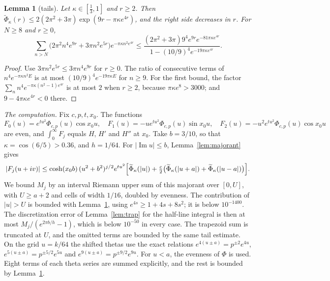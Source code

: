 \documentclass[11pt]{article}
\numberwithin{equation}{section}
\newtheorem{lemma}[theorem]{Lemma}
\theoremstyle{definition}
\theoremstyle{remark}
\DeclareMathOperator{\Ima}{Im}
\begin{document}
\begin{lemma}[tails]\label{lem:tails}
Let $\kappa\in[\tfrac13,1]$ and $r\ge2$. Then
$\widetilde\Phi_\kappa(r)\le2(2\pi^2+3\pi)\exp(9r-\pi\kappa e^{4r})$, and
the right side decreases in $r$. For $N\ge8$ and
$r\ge0$,
\[
\sum_{n>N}\bigl(2\pi^2n^4e^{9r}+3\pi n^2e^{5r}\bigr)e^{-\pi\kappa n^2e^{4r}}
\le\frac{(2\pi^2+3\pi)9^4e^{9r}e^{-81\pi\kappa e^{4r}}}
{1-(10/9)^4e^{-19\pi\kappa e^{4r}}} .
\]
\end{lemma}

\begin{proof}
Use $3\pi n^2e^{5r}\le3\pi n^4e^{9r}$ for $r\ge0$. The ratio of consecutive
terms of $n^4e^{-\pi\kappa n^2E}$ is at most $(10/9)^4e^{-19\pi\kappa E}$ for
$n\ge9$. For the first bound, the factor
$\sum_n n^4e^{-\pi\kappa(n^2-1)e^{4r}}$ is at most $2$ when $r\ge2$, because
$\pi\kappa e^{8}>3000$; and $9-4\pi\kappa e^{4r}<0$ there.
\end{proof}

\medskip\noindent\emph{The computation.} Fix $c,p,t,x_0$. The functions
\[
F_0(u)=e^{tu^2}\Phi_{c,p}(u)\cos x_0u,\quad
F_1(u)=-ue^{tu^2}\Phi_{c,p}(u)\sin x_0u,\quad
F_2(u)=-u^2e^{tu^2}\Phi_{c,p}(u)\cos x_0u
\]
are even, and $\int_0^\infty F_j$ equals $H$, $H'$ and $H''$ at $x_0$.
Take $b=3/10$, so that $\kappa=\cos(6/5)>0.36$, and $h=1/64$. For
$|\Ima u|\le b$, Lemma~\ref{lem:majorant} gives
\[
|F_j(u+iv)|\le\cosh(x_0b)\,(u^2+b^2)^{j/2}e^{tu^2}
\Bigl[\widetilde\Phi_\kappa(|u|)+\tfrac c2\bigl(\widetilde\Phi_\kappa(|u+a|)
+\widetilde\Phi_\kappa(|u-a|)\bigr)\Bigr].
\]
We bound $M_j$ by an interval Riemann upper sum of this majorant over
$[0,U]$, with $U\ge a+2$ and cells of width $1/16$, doubled by evenness. The
contribution of $|u|>U$ is bounded with Lemma~\ref{lem:tails}, using
$e^{4s}\ge1+4s+8s^2$; it is below $10^{-1400}$. The discretization error of
Lemma~\ref{lem:trap} for the half-line integral is then at most
$M_j/(e^{2\pi b/h}-1)$, which is below $10^{-50}$ in every case. The
trapezoid sum is truncated at $U$, and the omitted terms are bounded by the
same tail estimate. On the grid $u=k/64$ the shifted thetas use the exact
relations $e^{4(u\pm a)}=p^{\pm2}e^{4u}$, $e^{5(u\pm a)}=p^{\pm5/2}e^{5u}$
and $e^{9(u\pm a)}=p^{\pm9/2}e^{9u}$. For $u<a$, the evenness of $\Phi$ is
used. Eight terms of each theta series are summed explicitly, and the rest is
bounded by Lemma~\ref{lem:tails}.
\end{document}
